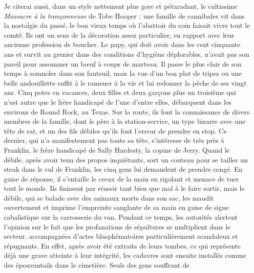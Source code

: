 %

Je citerai aussi, dans un style nettement plus gore et pétaradant, le cultissime \textit{Massacre à la tronçonneuse} de Tobe Hooper : une famille de cannibales vit dans la nostalgie du passé, le bon vieux temps où l’abattoir du coin faisait vivre tout le comté. Ils ont un sens de la décoration assez particulier, en rapport avec leur ancienne profession de boucher. Le papy, qui doit avoir dans les cent cinquante ans et survit au grenier dans des conditions d’hygiène déplorables, n’avait pas son pareil pour assommer un bœuf à coups de marteau. Il passe le plus clair de son temps à somnoler dans son fauteuil, mais la vue d’un bon plat de tripes ou une belle andouillette suffit à le ramener à la vie et lui redonner la pêche de ses vingt ans. Cinq potes en vacances, deux filles et deux garçons plus un troisième qui n’est autre que le frère handicapé de l’une d’entre elles, débarquent dans les environs de Round Rock, au Texas. Sur la route, ils font la connaissance de divers membres de la famille, dont le père à la station-service, un type bizarre avec une tête de rat, et un des fils débiles qu’ils font l’erreur de prendre en stop. Ce dernier, qui n’a manifestement pas toute sa tête, s’intéresse de très près à Franklin, le frère handicapé de Sally Hardesty, la copine de Jerry. Quand le débile, après avoir tenu des propos inquiétants, sort un couteau pour se tailler un steak dans le cul de Franklin, les cinq gens lui demandent de prendre congé. En guise de réponse, il s’entaille le creux de la main en rigolant et menace de tuer tout le monde. Ils finissent par réussir tant bien que mal à le faire sortir, mais le débile, qui se balade avec des animaux morts dans son sac, les maudit ouvertement et imprime l’empreinte sanglante de sa main en guise de signe cabalistique sur la carrosserie du van. Pendant ce temps, les autorités alertent l’opinion sur le fait que les profanations de sépultures se multiplient dans le secteur, accompagnées d’actes blasphématoires particulièrement scandaleux et répugnants. En effet, après avoir été extraits de leurs tombes, ce qui représente déjà une grave atteinte à leur intégrité, les cadavres sont ensuite installés comme des épouvantails dans le cimetière. Seuls des gens souffrant de 